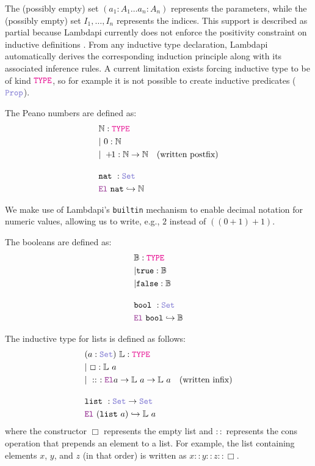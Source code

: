 The (possibly empty) set $(a_1 : A_1 \dots a_n : A_n)$ represents the parameters, while the (possibly empty) set $I_1, \dots, I_n$ represents the indices.
This support is described as partial because Lambdapi currently does not enforce the positivity constraint on inductive definitions \cite[\S 2.2]{inductive-type}.
From any inductive type declaration, Lambdapi automatically derives the corresponding induction principle along with its associated inference rules.
A current limitation exists forcing inductive type to be of kind $\type$, so for example it is not possible to create inductive predicates ($\prop$).


\begin{definition}[Natural]\label{def-nat}
The Peano numbers are defined as:
\begin{align*}
&\N: \type \\
&|~0 : \N \\
&|~+\!\!1: \N \ra \N \quad \text{(written postfix)} \\[1em]
& \kw{nat}~: \set \\
&  \el~\kw{nat} \re \N
\end{align*}
\end{definition}

We make use of Lambdapi's \lstinline[language=Lambdapi,basicstyle=\ttfamily\footnotesize]|builtin| mechanism to enable decimal notation for numeric values, allowing us to write, e.g., $2$ instead of $((0 +\!\!1) +\!\!1)$.

\begin{definition}[Boolean]\label{def-bool}
The booleans are defined as:
\begin{align*}
&\B: \type \\
&| \true : \B \\
&| \false : \B \\[1em]
& \kw{bool}~: \set \\
&  \el~\kw{bool} \re \B
\end{align*}
\end{definition}

\begin{definition}[List]\label{def:list}
The inductive type for lists is defined as follows:
\begin{align*}
&(a: \set)~ \bb{L}: \type \\
&|~\Box : \bb{L}~a \\
&|~\mathrel{::}~: \el  a \ra \bb{L}~a \ra \bb{L}~a \quad \text{(written infix)} \\[1em]
& \kw{list}~: \set \ra \set \\
&  \el~(\kw{list}~a) \re \bb{L}~a
\end{align*}
where the constructor $\Box$ represents the empty list and $\mathrel{::}$ represents the cons operation that prepends an element to a list.
For example, the list containing elements $x$, $y$, and $z$ (in that order) is written as $x \mathrel{::} y \mathrel{::} z \mathrel{::} \Box$.
\end{definition}


